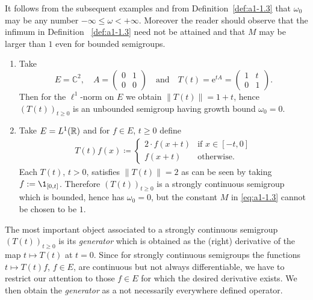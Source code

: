 It follows from the subsequent examples and from Definition~\ref{def:a1-1.3} that $\omega_{0}$ may be any number $ -\infty \leq \omega < +\infty$.
Moreover the reader should observe that the infimum in Definition ~\ref{def:a1-1.3} need not be attained and that $M$ may be larger than $1$ even for bounded semigroups.
\begin{examples}\label{ex:a1-1.4}
\begin{enumerate}[\upshape(i), wide, labelindent=.5em]

\item 
Take 
\[
	E = \mathbb{C}^{2}, \quad
	A = \begin{pmatrix}0 & 1\\0 & 0\end{pmatrix} 
	\quad \text{and} \quad 
	T(t) =  \mathrm{e}^{tA} = \begin{pmatrix}1 & t\\0 & 1\end{pmatrix} .
\]
%
Then for the $\ell^{1}$-norm on $E$ we obtain $\|T(t)\| = 1 + t$, hence $(T(t))_{t\geq0}$ is an unbounded semigroup having growth bound $\omega_{0} = 0$.

\item 
Take $E = L^1(\mathbb{R})$ and for $f \in E$, $t \geq 0$ define
\begin{align*}
T(t)f(x) \coloneqq 
	\begin{cases}
		2\cdot f(x+t) & \text{if } x \in [-t,0] \\
		f(x+t) & \text{otherwise}.
	\end{cases}
\end{align*}
Each $T(t)$, $t > 0$, satisfies $\|T(t)\| = 2$ as can be seen by taking $f := \1_{[0,t]}$.
Therefore $(T(t))_{t \geq 0}$ is a strongly continuous semigroup which is bounded, hence has $\omega_{0} = 0$, but the constant $M$ in \eqref{eq:a1-1.3} cannot be chosen to be $1$.

\end{enumerate}
\end{examples}
The most important object associated to a strongly continuous semigroup $(T(t))_{t\geq0}$ is its \emph{generator} which is obtained as the (right) derivative of the map $t \mapsto T(t)$ at $t = 0$.
Since for strongly continuous semigroups the functions $t \mapsto T(t)f$, $f \in E$, are continuous but not always differentiable, we have to restrict our attention to those $f \in E$ for which the desired derivative exists.
We then obtain the \emph{generator} as a not necessarily everywhere defined operator.

